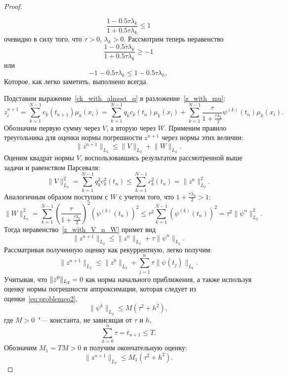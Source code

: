 \documentclass[11pt,a4paper,twoside]{report}
\numberwithin{equation}{section}
\theoremstyle{definition}
\theoremstyle{plain}
\DeclarePairedDelimiter\norm{\lVert}{\rVert}
\begin{document}
\begin{proof}
\begin{solution}
    $$
        \dfrac{1-0.5\tau\lambda_k}{1+0.5\tau\lambda_k} \leqslant 1
    $$
    очевидно в силу того, что $\tau > 0$, $\lambda_k > 0$. Рассмотрим теперь неравенство
    $$
        \dfrac{1-0.5\tau\lambda_k}{1+0.5\tau\lambda_k} \geqslant -1
    $$
    или
    $$
        -1-0.5\tau\lambda_k \leqslant 1-0.5\tau\lambda_k,
    $$
    Которое, как легко заметить, выполнено всегда.
\end{solution}
%
Подставим выражение~\eqref{ck_with_almost_q} в разложение~\eqref{z_with_mu}:
%
$$
    z_i^{n+1} = \sum_{k=1}^{N-1} c_k(t_{n+1})\mu_k(x_i) =
    \sum_{k=1}^{N-1} q_kc_k(t_n)\mu_k(x_i) + \sum_{k=1}^{N-1}
    \frac{\tau}{1+\frac{\tau\lambda_k}{2}} \psi^{(k)}(t_n)\mu_k(x_i).
$$
%
Обозначим первую сумму через $V$, а вторую через $W$. Применим правило треугольника
для оценки нормы погрешности $z^{n+1}$ через нормы этих величин:
%
\begin{equation}
%
    \label{z_with_V_n_W}
    \big\|z^{n+1}\big\|_{L_2} \leqslant \big\|V\big\|_{L_2} + \big\|W\big\|_{L_2}.
%
\end{equation}
%
Оценим квадрат нормы $V$, воспользовавшись результатом рассмотренной выше
задачи и равенством Парсеваля:
%
$$
    \big\|V\big\|_{L_2}^2 = \sum_{k=1}^{N-1} q_k^2 c_k^2(t_n) \leqslant
    \sum_{k=1}^{N-1} c_k^2(t_n) = \big\|z^n\big\|_{L_2}^2.
$$
%
Аналогичным образом поступим с $W$ с учетом того, что $1+\frac{\tau\lambda_k}{2} > 1$:
$$
    \big\|W\big\|_{L_2}^2 = \sum_{k=1}^{N-1} \left(\dfrac{\tau}{1+\frac{\tau\lambda_k}{2}}\right)^2
    \left(\psi^{(k)}(t_n)\right)^2 \leqslant \tau^2\sum_{k=1}^{N-1}
    \left(\psi^{(k)}(t_n)\right)^2 = \tau^2 \big\|\psi^n\big\|_{L_2}^2.
$$
%
Тогда неравенство~\eqref{z_with_V_n_W} примет вид
%
$$
    \big\|z^{n+1}\big\|_{L_2} \leqslant \big\|z^n\big\|_{L_2}
    + \tau \big\|\psi^n\big\|_{L_2}.
$$
%
Рассматривая полученную оценку как рекуррентную, легко получим:
%
\begin{equation}
    \label{z_estim}
    \big\|z^{n+1}\big\|_{L_2} \leqslant \big\|z^0\big\|_{L_2} +
    \sum_{j=1}^{n} \tau\big\|\psi(t_j)\big\|_{L_2}.
\end{equation}
%
Учитывая, что $\norm{z^0}_{L_2} = 0$ как норма начального приближения, а также
используя оценку нормы погрешности аппроксимации, которая следует из
оценки~\eqref{eq:problemeq2},
%
$$
    \big\|\psi^k\big\|_{L_2} \leqslant M\left(\tau^2 + h^2\right),
$$
%
где $M > 0$~"--- константа, не зависящая от $\tau$ и $h$,
%
$$
    \sum_{k = 0}^n\tau = t_{n+1} \leqslant T.
$$
%
Обозначим $M_1=TM > 0$ и получим окончательную оценку:
%
$$
    \big\|z^{n+1}\big\|_{L_2} \leqslant M_1\left(\tau^2 + h^2\right).
$$
%
%
\end{proof}
\end{document}
